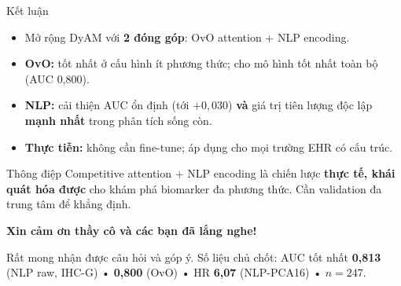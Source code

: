 \documentclass[aspectratio=169,11pt]{beamer}
\begin{document}
\begin{frame}{Kết luận}
  \begin{itemize}
    \item Mở rộng DyAM với \textbf{2 đóng góp}: OvO attention + NLP encoding.
    \item \textbf{OvO:} tốt nhất ở cấu hình ít phương thức; cho mô hình tốt nhất toàn bộ (AUC \alert{0,800}).
    \item \textbf{NLP:} cải thiện AUC ổn định (tới $+0{,}030$) \textbf{và} giá trị tiên lượng độc lập \textbf{mạnh nhất} trong phân tích sống còn.
    \item \textbf{Thực tiễn:} không cần fine-tune; áp dụng cho mọi trường EHR có cấu trúc.
  \end{itemize}
  \vfill
  \begin{alertblock}{Thông điệp}
    Competitive attention + NLP encoding là chiến lược \textbf{thực tế, khái quát hóa được} cho khám phá biomarker đa phương thức. Cần validation đa trung tâm để khẳng định.
  \end{alertblock}
\end{frame}

\begin{frame}[plain]
  \centering
  \vfill
  {\Large\color{vgreen}\textbf{Xin cảm ơn thầy cô và các bạn đã lắng nghe!}}
  \par\vspace{1em}
  {\normalsize Rất mong nhận được câu hỏi và góp ý.}
  \vfill
  {\footnotesize Số liệu chủ chốt: AUC tốt nhất \textbf{0,813} (NLP raw, IHC-G) • \textbf{0,800} (OvO) • HR \textbf{6,07} (NLP-PCA16) • $n=247$.}
  \vfill
\end{frame}
\end{document}
